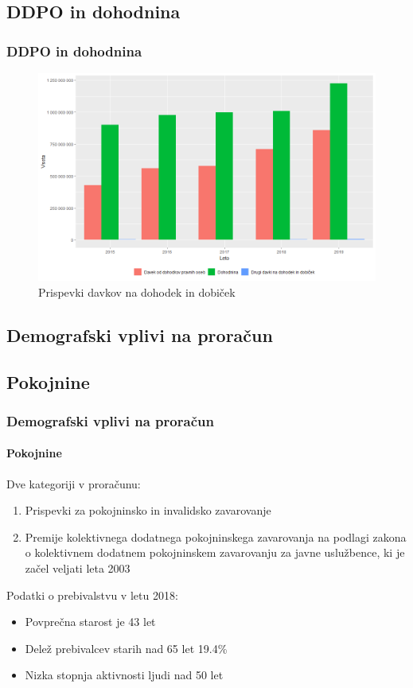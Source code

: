 \documentclass[10pt]{beamer}
\begin{document}
\begin{frame}
	\subsection[DDPO in dohodnina]{DDPO in dohodnina}
	\frametitle{DDPO in dohodnina}
	\begin{figure}[h!]
	\centering
	\includegraphics[width = 10 cm]{davki_na_dohodek_in_dobicek_graf.png}
	\caption{Prispevki davkov na dohodek in dobiček}
	\label{Slika 2}
	\end{figure}
\end {frame}


\begin{frame}
	\section[Demografski vplivi na proračun]{Demografski vplivi na proračun}
	\subsection[Pokojnine]{Pokojnine}
	\frametitle{Demografski vplivi na proračun}
	\framesubtitle{Pokojnine}
	Dve kategoriji v proračunu:
		\begin{enumerate}
			\item Prispevki za pokojninsko in invalidsko zavarovanje
			\item Premije kolektivnega dodatnega pokojninskega zavarovanja na podlagi zakona o kolektivnem dodatnem pokojninskem zavarovanju za javne uslužbence, ki je začel veljati leta 2003
		\end{enumerate}
	
	Podatki o prebivalstvu v letu 2018:
	\begin{itemize}
		\item Povprečna starost je 43 let
		\item Delež prebivalcev starih nad 65 let 19.4\%
		\item Nizka stopnja aktivnosti ljudi nad 50 let
	\end{itemize}
\end{frame}
\end{document}
